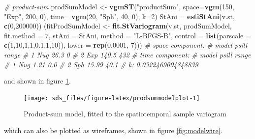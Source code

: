 \documentclass[]{book}
\newenvironment{Shaded}{\begin{snugshade}}{\end{snugshade}}
\newcommand{\CommentTok}[1]{\textcolor[rgb]{0.56,0.35,0.01}{\textit{#1}}}
\newcommand{\DataTypeTok}[1]{\textcolor[rgb]{0.13,0.29,0.53}{#1}}
\newcommand{\DecValTok}[1]{\textcolor[rgb]{0.00,0.00,0.81}{#1}}
\newcommand{\FloatTok}[1]{\textcolor[rgb]{0.00,0.00,0.81}{#1}}
\newcommand{\KeywordTok}[1]{\textcolor[rgb]{0.13,0.29,0.53}{\textbf{#1}}}
\newcommand{\NormalTok}[1]{#1}
\newcommand{\StringTok}[1]{\textcolor[rgb]{0.31,0.60,0.02}{#1}}
\begin{document}
\begin{Shaded}
\begin{Highlighting}[]
\CommentTok{# product-sum}
\NormalTok{prodSumModel <-}\StringTok{ }\KeywordTok{vgmST}\NormalTok{(}\StringTok{"productSum"}\NormalTok{,}
    \DataTypeTok{space=}\KeywordTok{vgm}\NormalTok{(}\DecValTok{150}\NormalTok{, }\StringTok{"Exp"}\NormalTok{, }\DecValTok{200}\NormalTok{, }\DecValTok{0}\NormalTok{),}
    \DataTypeTok{time=} \KeywordTok{vgm}\NormalTok{(}\DecValTok{20}\NormalTok{, }\StringTok{"Sph"}\NormalTok{,   }\DecValTok{40}\NormalTok{, }\DecValTok{0}\NormalTok{),}
    \DataTypeTok{k=}\DecValTok{2}\NormalTok{)}
\NormalTok{StAni =}\StringTok{ }\KeywordTok{estiStAni}\NormalTok{(v.st, }\KeywordTok{c}\NormalTok{(}\DecValTok{0}\NormalTok{,}\DecValTok{200000}\NormalTok{))}
\NormalTok{(fitProdSumModel <-}\StringTok{ }\KeywordTok{fit.StVariogram}\NormalTok{(v.st, prodSumModel, }\DataTypeTok{fit.method =} \DecValTok{7}\NormalTok{,}
    \DataTypeTok{stAni =}\NormalTok{ StAni, }\DataTypeTok{method =} \StringTok{"L-BFGS-B"}\NormalTok{,}
    \DataTypeTok{control =} \KeywordTok{list}\NormalTok{(}\DataTypeTok{parscale =} \KeywordTok{c}\NormalTok{(}\DecValTok{1}\NormalTok{,}\DecValTok{10}\NormalTok{,}\DecValTok{1}\NormalTok{,}\DecValTok{1}\NormalTok{,}\FloatTok{0.1}\NormalTok{,}\DecValTok{1}\NormalTok{,}\DecValTok{10}\NormalTok{)),}
    \DataTypeTok{lower =} \KeywordTok{rep}\NormalTok{(}\FloatTok{0.0001}\NormalTok{, }\DecValTok{7}\NormalTok{)))}
\CommentTok{# space component: }
\CommentTok{#   model psill range}
\CommentTok{# 1   Nug  26.3     0}
\CommentTok{# 2   Exp 140.5   432}
\CommentTok{# time component: }
\CommentTok{#   model psill range}
\CommentTok{# 1   Nug  1.21   0.0}
\CommentTok{# 2   Sph 15.99  40.1}
\CommentTok{# k: 0.0322469094848839}
\end{Highlighting}
\end{Shaded}

and shown in figure \ref{fig:prodsummodelplot}.

\begin{figure}

{\centering \texttt{[image: sds\_files/figure-latex/prodsummodelplot-1]} 

}

\caption{Product-sum model, fitted to the spatiotemporal sample variogram}\label{fig:prodsummodelplot}
\end{figure}

which can also be plotted as wireframes, shown in figure \ref{fig:modelwire}.
\end{document}
